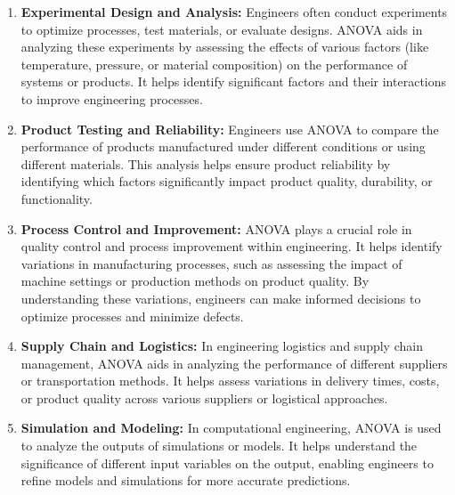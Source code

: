 \documentclass[
  a4paper,
]{scrbook}
\begin{document}
\begin{enumerate}
\def\labelenumi{\arabic{enumi}.}
\item
  \textbf{Experimental Design and Analysis:} Engineers often conduct
  experiments to optimize processes, test materials, or evaluate
  designs. ANOVA aids in analyzing these experiments by assessing the
  effects of various factors (like temperature, pressure, or material
  composition) on the performance of systems or products. It helps
  identify significant factors and their interactions to improve
  engineering processes.
\item
  \textbf{Product Testing and Reliability:} Engineers use ANOVA to
  compare the performance of products manufactured under different
  conditions or using different materials. This analysis helps ensure
  product reliability by identifying which factors significantly impact
  product quality, durability, or functionality.
\item
  \textbf{Process Control and Improvement:} ANOVA plays a crucial role
  in quality control and process improvement within engineering. It
  helps identify variations in manufacturing processes, such as
  assessing the impact of machine settings or production methods on
  product quality. By understanding these variations, engineers can make
  informed decisions to optimize processes and minimize defects.
\item
  \textbf{Supply Chain and Logistics:} In engineering logistics and
  supply chain management, ANOVA aids in analyzing the performance of
  different suppliers or transportation methods. It helps assess
  variations in delivery times, costs, or product quality across various
  suppliers or logistical approaches.
\item
  \textbf{Simulation and Modeling:} In computational engineering, ANOVA
  is used to analyze the outputs of simulations or models. It helps
  understand the significance of different input variables on the
  output, enabling engineers to refine models and simulations for more
  accurate predictions.
\end{enumerate}
\end{document}
